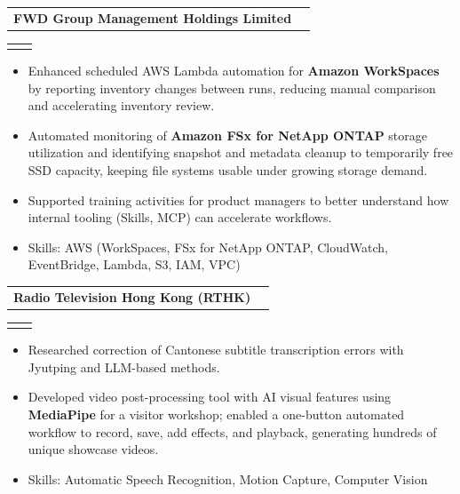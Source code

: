 \documentclass[a4paper,10pt]{article}
\makeatletter
\newcommand{\resumeItem}[1]{
  \item\small{#1}
}
\newcommand{\resumeItemListStart}{
  \begin{itemize}[
    leftmargin=0.2in,
    rightmargin=0.2in,
    itemindent=0pt,
    labelsep=0.1in,
    itemsep=1pt,
    parsep=0pt,
    topsep=3pt,
    label={\raisebox{2pt}{\tiny$\bullet$}}
  ]
}
\newcommand{\resumeItemListEnd}{\end{itemize}}
\newenvironment{resumeExperience}[2]{%
  \vspace{-2pt}\item
    \begin{tabular*}{0.97\textwidth}[t]{@{}l@{\extracolsep{\fill}}r@{}}
      \textbf{#1} & \small#2 \\
    \end{tabular*}\vspace{-7pt}%
    \begin{resumeRoleList}%
}{%
    \end{resumeRoleList}%
}
\newcommand{\resumeRole}[2]{%
  \item
    \begin{tabular*}{0.97\textwidth}[t]{@{}l@{\extracolsep{\fill}}r@{}}
      \textlight{\small#1} & \textlight{\small#2} \\
    \end{tabular*}
}
\makeatother
\begin{document}
    \begin{resumeExperience}{FWD Group Management Holdings Limited}{}
      \resumeRole{Summer Intern, Finance Cloud Infrastructure and Operations, Group Technology Services}{Jun 2026 -- Aug 2026}
        \resumeItemListStart
          \resumeItem{Enhanced scheduled AWS Lambda automation for \textbf{Amazon WorkSpaces} by reporting inventory changes between runs, reducing manual comparison and accelerating inventory review.}
          \resumeItem{Automated monitoring of \textbf{Amazon FSx for NetApp ONTAP} storage utilization and identifying snapshot and metadata cleanup to temporarily free SSD capacity, keeping file systems usable under growing storage demand.}
          \resumeItem{Supported training activities for product managers to better understand how internal tooling (Skills, MCP) can accelerate workflows.}
          \resumeItem{Skills: AWS (WorkSpaces, FSx for NetApp ONTAP, CloudWatch, EventBridge, Lambda, S3, IAM, VPC)}
        \resumeItemListEnd
    \end{resumeExperience}

    \begin{resumeExperience}{Radio Television Hong Kong (RTHK)}{}
      \resumeRole{Summer Intern, Engineering Section (Broadcast Systems), Production Services Division}{Jun 2025 -- Aug 2025}
        \resumeItemListStart
          \resumeItem{Researched correction of Cantonese subtitle transcription errors with Jyutping and LLM-based methods.}%
          \resumeItem{Developed video post-processing tool with AI visual features using \textbf{MediaPipe} for a visitor workshop; enabled a one-button automated workflow to record, save, add effects, and playback, generating hundreds of unique showcase videos.}
          \resumeItem{Skills: Automatic Speech Recognition, Motion Capture, Computer Vision}
        \resumeItemListEnd
    \end{resumeExperience}

\end{document}
